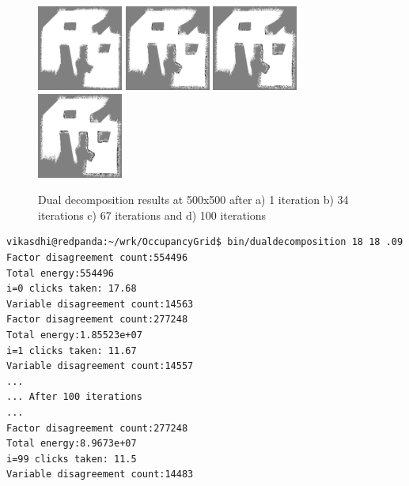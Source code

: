 \documentclass[10pt,oneside,letterpaper]{article}
\begin{document}
\begin{figure}
  \includegraphics[width=0.25\textwidth]{dualdecomposition0_500x500.png}%
  \includegraphics[width=0.25\textwidth]{dualdecomposition33_500x500.png}%
  \includegraphics[width=0.25\textwidth]{dualdecomposition66_500x500.png}%
  \includegraphics[width=0.25\textwidth]{dualdecomposition99_500x500.png}
  \caption{Dual decomposition results at 500x500 after a) 1 iteration b) 34 iterations c) 67 iterations and d) 100 iterations}
  \label{fig:dualdecomposition500x500}
\end{figure}

\lstset{language=Bash}
\begin{lstlisting}
vikasdhi@redpanda:~/wrk/OccupancyGrid$ bin/dualdecomposition 18 18 .09
Factor disagreement count:554496
Total energy:554496
i=0 clicks taken: 17.68
Variable disagreement count:14563
Factor disagreement count:277248
Total energy:1.85523e+07
i=1 clicks taken: 11.67
Variable disagreement count:14557
...
... After 100 iterations
...
Factor disagreement count:277248
Total energy:8.9673e+07
i=99 clicks taken: 11.5
Variable disagreement count:14483
\end{lstlisting}
\end{document}

